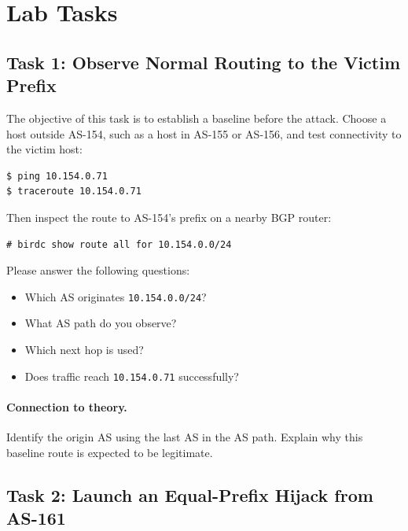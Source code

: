 \section{Lab Tasks}

\subsection{Task 1: Observe Normal Routing to the Victim Prefix}

The objective of this task is to establish a baseline before the attack.
Choose a host outside AS-154, such as a host in AS-155 or AS-156, and test
connectivity to the victim host:

\begin{lstlisting}
$ ping 10.154.0.71
$ traceroute 10.154.0.71
\end{lstlisting}

Then inspect the route to AS-154's prefix on a nearby BGP router:

\begin{lstlisting}
# birdc show route all for 10.154.0.0/24
\end{lstlisting}

Please answer the following questions:

\begin{itemize}[noitemsep]
\item Which AS originates \texttt{10.154.0.0/24}?
\item What AS path do you observe?
\item Which next hop is used?
\item Does traffic reach \texttt{10.154.0.71} successfully?
\end{itemize}

\paragraph{Connection to theory.}
Identify the origin AS using the last AS in the AS path. Explain why this
baseline route is expected to be legitimate.


\subsection{Task 2: Launch an Equal-Prefix Hijack from AS-161}

